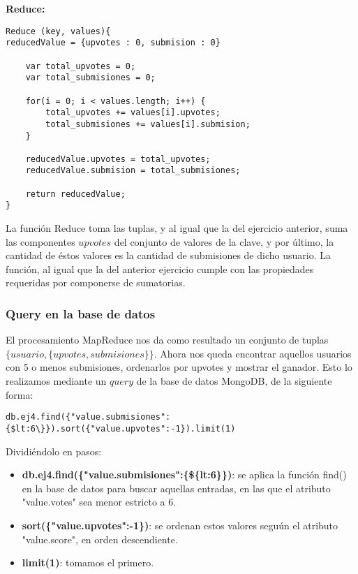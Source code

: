 \vspace{2mm}

\textbf{Reduce:}

\begin{lstlisting}
Reduce (key, values){
reducedValue = {upvotes : 0, submision : 0}
	
	var total_upvotes = 0;
	var total_submisiones = 0;

	for(i = 0; i < values.length; i++) {
		total_upvotes += values[i].upvotes;
		total_submisiones += values[i].submision;
	}

	reducedValue.upvotes = total_upvotes;
	reducedValue.submision = total_submisiones;

    return reducedValue;
}
\end{lstlisting}

\vspace{2mm}

La funci\'on Reduce toma las tuplas, y al igual que la del ejercicio anterior, suma las componentes $upvotes$ del conjunto de valores de la clave, y por \'ultimo, la cantidad de \'estos valores es la cantidad de submisiones de dicho usuario. La funci\'on, al igual que la del anterior ejercicio cumple con las propiedades requeridas por componerse de sumatorias.

\subsubsection{Query en la base de datos}

El procesamiento MapReduce nos da como resultado un conjunto de tuplas $\{usuario, \{ upvotes, submisiones \}\}$. Ahora nos queda encontrar aquellos usuarios con 5 o menos submisiones, ordenarlos por upvotes y mostrar el ganador. Esto lo realizamos mediante un $query$ de la base de datos MongoDB, de la siguiente forma:

\vspace{2mm}

\begin{lstlisting}
db.ej4.find({"value.submisiones":{$lt:6\}}).sort({"value.upvotes":-1}).limit(1)
\end{lstlisting}

Dividi\'endolo en pasos:

\begin{itemize}

\item \textbf{db.ej4.find(\{"value.submisiones":\{\$\{lt:6\}\})}: se aplica la funci\'on find() en la base de datos para buscar aquellas entradas, en las que el atributo "value.votes" sea menor estricto a 6.

\item \textbf{sort(\{"value.upvotes":-1\})}: se ordenan estos valores segu\'un el atributo "value.score", en orden descendiente.

\item \textbf{limit(1)}: tomamos el primero.

\end{itemize}

